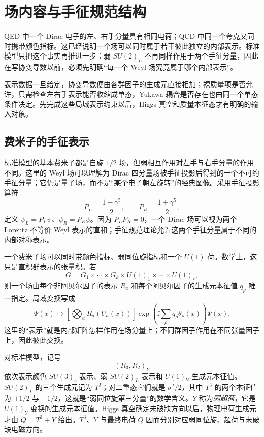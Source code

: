 \section{场内容与手征规范结构}\label{sec:sm-fields-gauge-dp11}

QED 中一个 Dirac 电子的左、右手分量具有相同电荷；QCD 中同一个夸克又同时携带颜色指标。这已经说明一个场可以同时属于若干彼此独立的内部表示。标准模型只把这个事实再推进一步：弱 $SU(2)_L$ 不再同样作用于两个手征分量，因此在写协变导数以前，必须先明确“每一个 Weyl 场究竟属于哪个内部表示”。

表示数据一旦给定，协变导数便由各群因子的生成元直接相加；裸质量项是否允许，只需检查左右手表示能否收缩成单态，Yukawa 耦合是否存在也由同一个单态条件决定。先完成这些局域表示约束以后，Higgs 真空和质量本征态才有明确的输入对象。

\subsection{费米子的手征表示}

标准模型的基本费米子都是自旋 $1/2$ 场，但弱相互作用对左手与右手分量的作用不同。这里的 Weyl 场可以理解为 Dirac 四分量场被手征投影后得到的一个不可约手征分量；它仍是量子场，而不是“某个电子朝左旋转”的经典图像。采用手征投影算符
\begin{equation*}
 P_L=\frac{1-\gamma^5}{2},
 \qquad
 P_R=\frac{1+\gamma^5}{2},
\end{equation*}
定义 $\psi_L=P_L\psi$、$\psi_R=P_R\psi$。因为 $P_LP_R=0$，一个 Dirac 场可以视为两个 Lorentz 不等价 Weyl 表示的直和；手征规范理论允许这两个手征分量属于不同的内部对称表示。

一个费米子场可以同时带颜色指标、弱同位旋指标和一个 $U(1)$ 荷。数学上，这只是直积群表示的张量积。若
\begin{equation*}
 G=G_1\times\cdots\times G_k\times U(1)_1\times\cdots\times U(1)_r,
\end{equation*}
则一个场由每个非阿贝尔因子的表示 $R_a$ 和每个阿贝尔因子的生成元本征值 $q_\rho$ 唯一指定。局域变换写成
\begin{equation*}
 \Psi(x)\mapsto
 \left[\bigotimes_aR_a(U_a(x))\right]
 \exp\!\left(\ii\sum_\rho q_\rho\theta_\rho(x)\right)\Psi(x).
\end{equation*}
这里的“表示”就是内部矩阵怎样作用在场分量上；不同群因子作用在不同张量因子上，因此彼此交换。

对标准模型，记号
\begin{equation*}
 (R_3,R_2)_Y
\end{equation*}
依次表示颜色 $SU(3)_c$ 表示、弱 $SU(2)_L$ 表示和 $U(1)_Y$ 生成元本征值。$SU(2)_L$ 的三个生成元记为 $T^I$；对二重态它们就是 $\sigma^I/2$，其中 $T^3$ 的两个本征值为 $+1/2$ 与 $-1/2$，这就是“弱同位旋第三分量”的数学含义。$Y$ 称为\emph{弱超荷}，它是 $U(1)_Y$ 变换的生成元本征值。Higgs 真空确定未破缺方向以后，物理电荷生成元才由 $Q=T^3+Y$ 给出。$T^3$、$Y$ 与最终电荷 $Q$ 因而分别对应弱同位旋、超荷与未破缺电磁方向。

